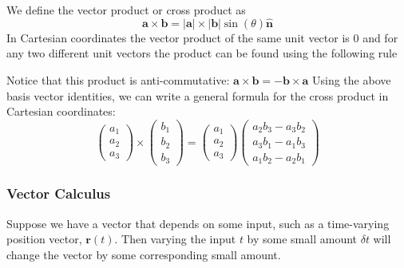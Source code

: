 \documentclass[11pt,titlepage]{article}
\numberwithin{equation}{section}
\begin{document}
We define the vector product or cross product as
\begin{equation}
    \mathbf{a}\times\mathbf{b}=|\mathbf{a}|\times|\mathbf{b}|\sin(\theta)\mathbf{\hat{n}}
\end{equation}
In Cartesian coordinates the vector product of the same unit vector is 0 and for any two different unit vectors the product can be found using the following rule
\begin{tcolorbox}
\centering
{}
\end{tcolorbox}
Notice that this product is anti-commutative: $\mathbf{a} \times \mathbf{b} = -\mathbf{b} \times \mathbf{a}$
Using the above basis vector identities, we can write a general formula for the cross product in
Cartesian coordinates:
\begin{equation}
\left(
    \begin{array}{c}
         a_1 \\
         a_2 \\
         a_3
    \end{array}
    \right)
\times
\left(
    \begin{array}{c}
         b_1 \\
         b_2 \\
         b_3
    \end{array}
    \right)
    =
    \left(
    \begin{array}{c}
         a_1 \\
         a_2 \\
         a_3
    \end{array}
    \right)
    \left(
    \begin{array}{c}
         a_2b_3-a_3b_2 \\
         a_3b_1-a_1b_3 \\
         a_1b_2-a_2b_1
    \end{array}
    \right)
\end{equation}
\subsubsection{Vector Calculus}
Suppose we have a vector that depends on some input, such as a time-varying position vector, $\mathbf{r}(t)$. Then varying the input $t$ by some small amount $\delta t$ will change the vector by some corresponding small amount.
\end{document}
